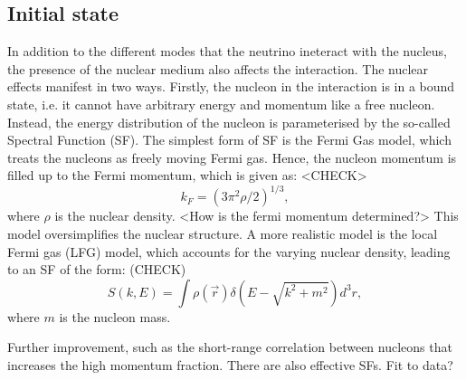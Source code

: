   \subsection{Initial state}
  In addition to the different modes that the neutrino ineteract with the nucleus, the presence of the nuclear medium also affects the interaction.
  The nuclear effects manifest in two ways.
  Firstly, the nucleon in the interaction is in a bound state, i.e. it cannot have arbitrary energy and momentum like a free nucleon.
  Instead, the energy distribution of the nucleon is parameterised by the so-called Spectral Function (SF).
  The simplest form of SF is the Fermi Gas model, which treats the nucleons as freely moving Fermi gas.
  Hence, the nucleon momentum is filled up to the Fermi momentum, which is given as:
  <CHECK>
  \begin{equation}
      k_F = (3\pi^2 \rho/2)^{1/3},
  \end{equation}
  where $\rho$ is the nuclear density.
  <How is the fermi momentum determined?>
  This model oversimplifies the nuclear structure.
  A more realistic model is the local Fermi gas (LFG) model, which accounts for the varying nuclear density, leading to an SF of the form:
  (CHECK)
  \begin{equation}
      S(k, E) = \int \rho(\vec{r}) \delta(E - \sqrt{k^2 + m^2}) d^3r,
  \end{equation}
  where $m$ is the nucleon mass.

  Further improvement, such as the short-range correlation between nucleons that increases the high momentum fraction.
  There are also effective SFs. Fit to data?

